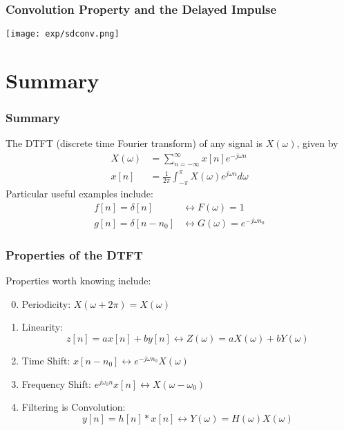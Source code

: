\documentclass{beamer}
\begin{document}
\begin{frame}
  \frametitle{Convolution Property and the Delayed Impulse}

  \centerline{\texttt{[image: exp/sdconv.png]}}
\end{frame}

\section[Summary]{Summary}
\setcounter{subsection}{1}

\begin{frame}
  \frametitle{Summary}

  The DTFT (discrete time Fourier transform) of any signal is
  $X(\omega)$, given by
  \begin{align*}
    X(\omega) &= \sum_{n=-\infty}^\infty x[n]e^{-j\omega n}\\
    x[n] &= \frac{1}{2\pi}\int_{-\pi}^\pi X(\omega)e^{j\omega n}d\omega
  \end{align*}
  Particular useful examples include:
  \begin{align*}
    f[n]=\delta[n] &\leftrightarrow F(\omega)=1\\
    g[n]=\delta[n-n_0] &\leftrightarrow G(\omega)=e^{-j\omega n_0}
  \end{align*}
\end{frame}

\begin{frame}
  \frametitle{Properties of the DTFT}

  Properties worth knowing  include:
  \begin{enumerate}
    \setcounter{enumi}{-1}
  \item Periodicity: $X(\omega+2\pi)=X(\omega)$
  \item Linearity:
    \[z[n]=ax[n]+by[n]\leftrightarrow Z(\omega)=aX(\omega)+bY(\omega)
    \]
  \item Time Shift: $x[n-n_0]\leftrightarrow e^{-j\omega n_0}X(\omega)$
  \item Frequency Shift: $e^{j\omega_0 n}x[n]\leftrightarrow X(\omega-\omega_0)$
  \item Filtering is Convolution:
    \[
    y[n]=h[n]\ast x[n]\leftrightarrow Y(\omega)=H(\omega)X(\omega)
    \]
  \end{enumerate}
\end{frame}
\end{document}
